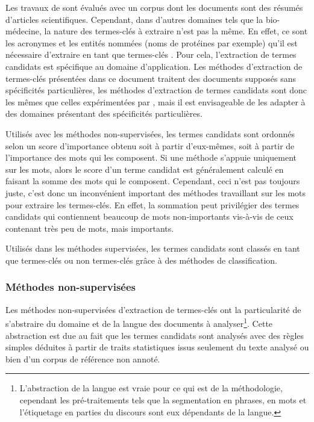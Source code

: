     Les travaux de \citet{hulth2003keywordextraction} sont évalués avec un corpus
    dont les documents sont des résumés d'articles scientifiques. Cependant, dans
    d'autres domaines tels que la bio-médecine, la nature des termes-clés à
    extraire n'est pas la même. En effet, ce sont les acronymes et les entités
    nommées (noms de protéines par exemple) qu'il est nécessaire d'extraire en
    tant que termes-clés \citep{nobata2008kleio}. Pour cela, l'extraction de
    termes candidats est spécifique au domaine d'application. Les méthodes
    d'extraction de termes-clés présentées dans ce document traitent des documents
    supposés sans spécificités particulières, les méthodes d'extraction de termes
    candidats sont donc les mêmes que celles expérimentées par
    \citet{hulth2003keywordextraction}, mais il est envisageable de les adapter à
    des domaines présentant des spécificités particulières.

    Utilisés avec les méthodes non-supervisées, les termes candidats sont ordonnés
    selon un score d'importance obtenu soit à partir d'eux-mêmes, soit à partir de
    l'importance des mots qui les composent. Si une méthode s'appuie uniquement
    sur les mots, alors le score d'un terme candidat est généralement calculé en
    faisant la somme des mots qui le composent. Cependant, ceci n'est pas toujours
    juste, c'est donc un inconvénient important des méthodes travaillant sur les
    mots pour extraire les termes-clés. En effet, la sommation peut privilégier
    des termes candidats qui contiennent beaucoup de mots non-importants vis-à-vis
    de ceux contenant très peu de mots, mais importants.
    
    Utilisés dans les méthodes supervisées, les termes candidats sont classés en
    tant que termes-clés ou non termes-clés grâce à des méthodes de
    classification.

    \subsubsection{Méthodes non-supervisées}
    \label{sec:unsupervised_methods}
      Les méthodes non-supervisées d'extraction de termes-clés ont la
      particularité de s'abstraire du domaine et de la langue des documents à
      analyser\footnote{L'abstraction de la langue est vraie pour ce qui est de la
      méthodologie, cependant les pré-traitements tels que la segmentation en
      phrases, en mots et l'étiquetage en parties du discours sont eux dépendants
      de la langue.}. Cette abstraction est due au fait que les termes candidats
      sont analysés avec des règles simples déduites à partir de traits
      statistiques issus seulement du texte analysé ou bien d'un corpus de
      référence non annoté.

